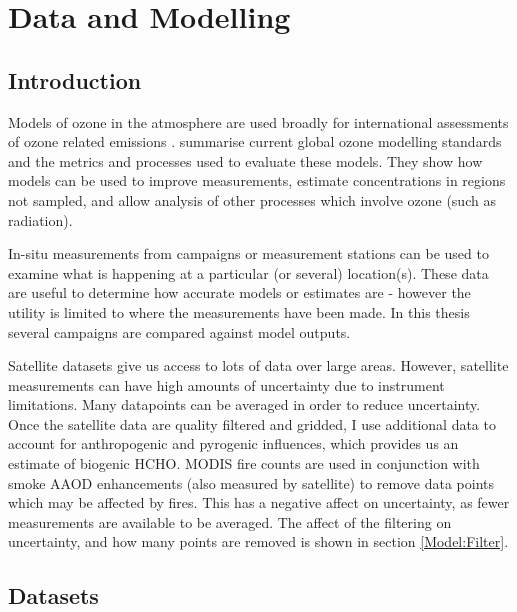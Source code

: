 
\chapter{Data and Modelling} %
\label{Model} %
  
\section{Introduction}
  Models of ozone in the atmosphere are used broadly for international assessments of ozone related emissions \parencite{Young2018}.
  \textcite{Young2018} summarise current global ozone modelling standards and the metrics and processes used to evaluate these models.
  They show how models can be used to improve measurements, estimate concentrations in regions not sampled, and allow analysis of other processes which involve ozone (such as radiation).
  
  In-situ measurements from campaigns or measurement stations can be used to examine what is happening at a particular (or several) location(s).
  These data are useful to determine how accurate models or estimates are - however the utility is limited to where the measurements have been made.
  In this thesis several campaigns are compared against model outputs.
  
  Satellite datasets give us access to lots of data over large areas.
  However, satellite measurements can have high amounts of uncertainty due to instrument limitations.
  Many datapoints can be averaged in order to reduce uncertainty.
  Once the satellite data are quality filtered and gridded, I use additional data to account for anthropogenic and pyrogenic influences, which provides us an estimate of biogenic HCHO.
  MODIS fire counts are used in conjunction with smoke AAOD enhancements (also measured by satellite) to remove data points which may be affected by fires. 
  This has a negative affect on uncertainty, as fewer measurements are available to be averaged. 
  The affect of the filtering on uncertainty, and how many points are removed is shown in section \ref{Model:Filter}.

\section{Datasets}
\label{Model:Datasets}

